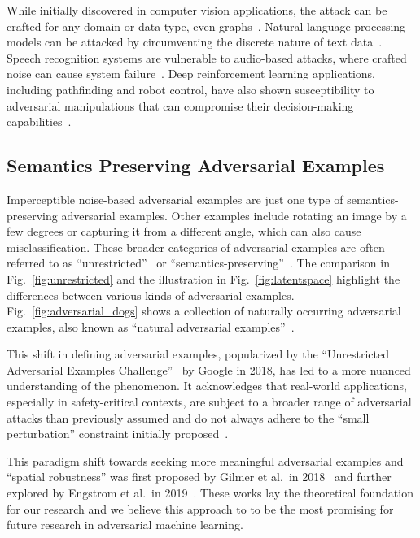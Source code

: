 \documentclass[a4paper, oneside]{discothesis}
\begin{document}
While initially discovered in computer vision applications, the attack can be crafted for any domain or data type, even graphs~\cite{Kashyap2024AdversarialAA}. Natural language processing models can be attacked by circumventing the discrete nature of text data~\cite{Han2022TextAA, meng2020geometry, yang2024assessing}. Speech recognition systems are vulnerable to audio-based attacks, where crafted noise can cause system failure~\cite{rajaratnam2018noise}. Deep reinforcement learning applications, including pathfinding and robot control, have also shown susceptibility to adversarial manipulations that can compromise their decision-making capabilities~\cite{Bai2018AdversarialEC}.

\subsection{Semantics Preserving Adversarial Examples}

Imperceptible noise-based adversarial examples are just one type of semantics-preserving adversarial examples. Other examples include rotating an image by a few degrees or capturing it from a different angle, which can also cause misclassification. These broader categories of adversarial examples are often referred to as ``unrestricted''~\cite{fazlija2024real, brown2018unrestricted} or ``semantics-preserving''~\cite{browne2020semantics, careil2023towards, lee2020semantics}. The comparison in Fig.~\ref{fig:unrestricted} and the illustration in Fig.~\ref{fig:latentspace} highlight the differences between various kinds of adversarial examples. Fig.~\ref{fig:adversarial_dogs} shows a collection of naturally occurring adversarial examples, also known as ``natural adversarial examples''~\cite{hendrycks2021natural, teenybiscuittweet}.

This shift in defining adversarial examples, popularized by the ``Unrestricted Adversarial Examples Challenge''~\cite{brown2018unrestricted} by Google in 2018, has led to a more nuanced understanding of the phenomenon. It acknowledges that real-world applications, especially in safety-critical contexts, are subject to a broader range of adversarial attacks than previously assumed and do not always adhere to the ``small perturbation'' constraint initially proposed~\cite{brown2018unrestricted}.

This paradigm shift towards seeking more meaningful adversarial examples and ``spatial robustness'' was first proposed by Gilmer et al.\ in 2018~\cite{gilmer2018motivating} and further explored by Engstrom et al.\ in 2019~\cite{engstrom2019exploring}. These works lay the theoretical foundation for our research and we believe this approach to to be the most promising for future research in adversarial machine learning.
\end{document}
